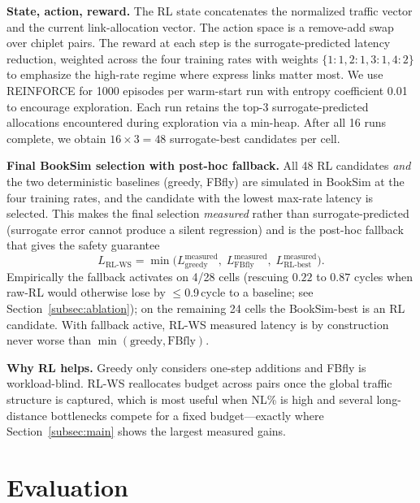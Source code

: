 \documentclass[conference]{IEEEtran}
\begin{document}
\textbf{State, action, reward.} The RL state concatenates the normalized traffic vector and the current link-allocation vector. The action space is a remove-add swap over chiplet pairs. The reward at each step is the surrogate-predicted latency reduction, weighted across the four training rates with weights $\{1{:}1, 2{:}1, 3{:}1, 4{:}2\}$ to emphasize the high-rate regime where express links matter most. We use REINFORCE for 1000 episodes per warm-start run with entropy coefficient 0.01 to encourage exploration. Each run retains the top-3 surrogate-predicted allocations encountered during exploration via a min-heap. After all 16 runs complete, we obtain $16{\times}3{=}48$ surrogate-best candidates per cell.

\textbf{Final BookSim selection with post-hoc fallback.} All 48 RL candidates \textit{and} the two deterministic baselines (greedy, FBfly) are simulated in BookSim at the four training rates, and the candidate with the lowest max-rate latency is selected. This makes the final selection \textit{measured} rather than surrogate-predicted (surrogate error cannot produce a silent regression) and is the post-hoc fallback that gives the safety guarantee
\begin{equation}
\label{eq:fallback}
L_{\text{RL-WS}} = \min\bigl(L_{\text{greedy}}^{\text{measured}},\; L_{\text{FBfly}}^{\text{measured}},\; L_{\text{RL-best}}^{\text{measured}}\bigr).
\end{equation}
Empirically the fallback activates on 4/28 cells (rescuing $0.22$ to $0.87$ cycles when raw-RL would otherwise lose by $\le$0.9\,cycle to a baseline; see Section~\ref{subsec:ablation}); on the remaining 24 cells the BookSim-best is an RL candidate. With fallback active, RL-WS measured latency is by construction never worse than $\min(\text{greedy}, \text{FBfly})$.

\textbf{Why RL helps.} Greedy only considers one-step additions and FBfly is workload-blind. RL-WS reallocates budget across pairs once the global traffic structure is captured, which is most useful when NL\% is high and several long-distance bottlenecks compete for a fixed budget---exactly where Section~\ref{subsec:main} shows the largest measured gains.

\section{Evaluation}
\end{document}
